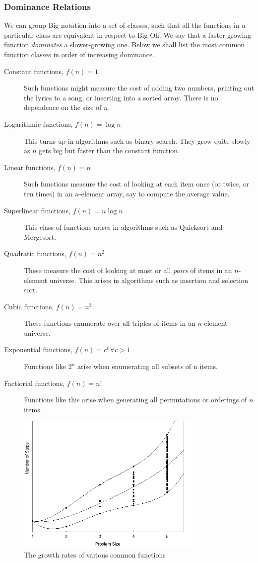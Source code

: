 		\subsubsection{Dominance Relations}
			We can group Big notation into a set of classes, such that all the functions in a particular class are equivalent in respect to Big Oh. We say that a faster growing function \textit{dominates} a slower-growing one. Below we shall list the most common function classes in order of increasing dominance.
			\begin{description}
				\item[Constant functions, $f(n) = 1$] Such functions might measure the cost of adding two numbers, printing out the lyrics to a song, or inserting into a sorted array. There is no dependence on the size of $n$.
				\item[Logarithmic functions, $f(n) = \log n$] This turns up in algorithms such as binary search. They grow quite slowly as $n$ gets big but faster than the constant function.
				\item[Linear functions, $f(n) = n$] Such functions measure the cost of looking at each item once (or twice, or ten times) in an $n$-element array, say to compute the average value.
				\item[Superlinear functions, $f(n) = n \log n$] This class of functions arises in algorithms such as Quicksort and Mergesort.
				\item[Quadratic functions, $f(n) = n^2$] These measure the cost of looking at most or all \textit{pairs} of items in an $n$-element universe. This arises in algorithms such as insertion and selection sort.
				\item[Cubic functions, $f(n) = n^3$] These functions enumerate over all triples of items in an $n$-element universe. 
				\item[Exponential functions, $f(n) = c^n \forall c > 1$] Functions like $2^n$ arise when enumerating all subsets of n items.
				\item[Factiorial functions, $f(n) = n!$] Functions like this arise when generating all permutations or orderings of $n$ items.
			\end{description}
			\begin{figure}[t]
				\centering
				\includegraphics[width=0.8\textwidth]{./assets/imgs/bigOcomplexity.png}
				\caption{\label{fig:bigODominanceRelationships} The growth rates of various common functions}
			\end{figure}			
